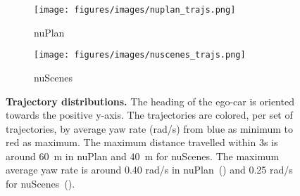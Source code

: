 
\begin{figure}[h]
\centering
\begin{subfigure}{0.48\linewidth} 
\texttt{[image: figures/images/nuplan\_trajs.png]}
  \caption{nuPlan~\cite{caesar2021nuplan}}
\hfill
\label{fig:nuplan_trajs}
\end{subfigure}
\centering
\begin{subfigure}{0.48\linewidth}
\texttt{[image: figures/images/nuscenes\_trajs.png]}     
  \caption{nuScenes~\cite{caesar2020nuscenes}}
  \hfill
\label{fig:nuscenes_trajs}
\end{subfigure}
\caption{\textbf{Trajectory distributions.} The heading of the ego-car is oriented towards the positive y-axis. The trajectories are colored, per set of trajectories, by average yaw rate (rad/s) from blue as minimum to red as maximum. The maximum distance travelled within 3s is around 60~m in nuPlan and 40~m for nuScenes. The maximum average yaw rate is around 0.40 rad/s in nuPlan~() and 0.25 rad/s for nuScenes~().}
\label{fig:trajectories}
\end{figure}

